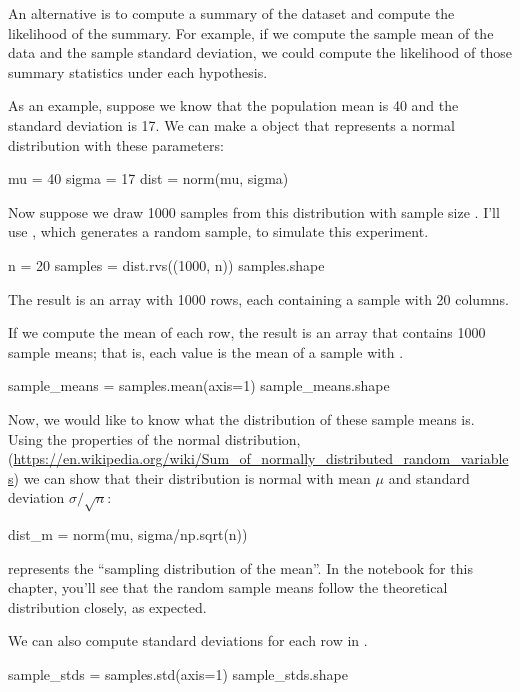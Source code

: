 \documentclass[12pt]{book}
\theoremstyle{exercise}
\begin{document}
An alternative is to compute a summary of the dataset and compute the
likelihood of the summary. For example, if we compute the sample mean of
the data and the sample standard deviation, we could compute the
likelihood of those summary statistics under each hypothesis.

As an example, suppose we know that the population mean is 40 and the
standard deviation is 17. We can make a 
object that represents a normal distribution with these parameters:

\begin{code}
mu = 40
sigma = 17
dist = norm(mu, sigma)
\end{code}

Now suppose we draw 1000 samples from this distribution with sample size
. I'll use ,
which generates a random sample, to simulate this experiment.

\begin{code}
n = 20
samples = dist.rvs((1000, n))
samples.shape
\end{code}

The result is an array with 1000 rows, each containing a sample with 20
columns.

If we compute the mean of each row, the result is an array that contains
1000 sample means; that is, each value is the mean of a sample with
.

\begin{code}
sample_means = samples.mean(axis=1)
sample_means.shape
\end{code}

Now, we would like to know what the distribution of these sample means
is. Using the properties of the normal distribution,
(\url{https://en.wikipedia.org/wiki/Sum_of_normally_distributed_random_variables}) we
can show that their distribution is normal with mean $\mu$ and
standard deviation $\sigma/\sqrt{n}$:

\begin{code}
dist_m = norm(mu, sigma/np.sqrt(n))
\end{code}

 represents the ``sampling distribution
of the mean''.
In the notebook for this chapter, you'll see that the random sample means follow the theoretical
distribution closely, as expected.

We can also compute standard deviations for each row in
.

\begin{code}
sample_stds = samples.std(axis=1)
sample_stds.shape
\end{code}
\end{document}
